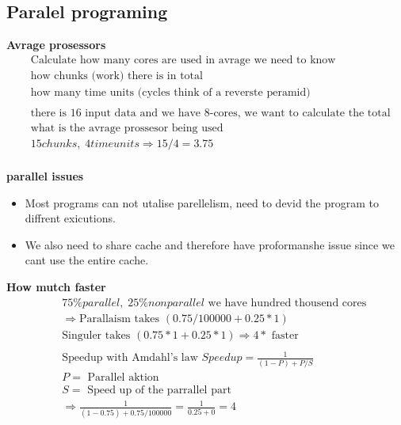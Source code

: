 \subsection{Paralel programing}


\textbf{Avrage prosessors}
\begin{align*}
  &\quad  \text{Calculate how many cores are used in avrage we need to know } \\
  &\quad  \text{how chunks (work) there is in total } \\
  &\quad  \text{how many time units (cycles think of a reverste peramid)} \\
  &\quad  \\
  &\quad  \text{there is 16 input data and we have 8-cores, we want to calculate the total sum} \\
  &\quad  \text{what is the avrage prossesor being used} \\
  &\quad  15 chunks, \; 4 time units \Rightarrow 15/4 = 3.75 \\
\end{align*}

\textbf{parallel issues}
\begin{itemize}
\item  Most programs can not utalise parellelism, need to devid the program to diffrent exicutions.
\item  We also need to share cache and therefore have proformanshe issue since we cant use the entire cache.
\end{itemize}


\textbf{How mutch faster}
\begin{align*}
  &\quad  75\% parallel, \; 25\% non parallel \text{ we have hundred thousend cores } \\
  &\quad  \Rightarrow  \text{Parallaism takes } (0.75/100000 + 0.25*1) \\
  &\quad  \text{Singuler takes } (0.75*1 + 0.25*1)  \Rightarrow 4* \text{ faster} \\
  &\quad  \\
  &\quad  \text{Speedup with Amdahl's law } Speedup=\frac{1}{(1-P)+P/S} \\
  &\quad  P= \text{ Parallel aktion} \\
  &\quad  S= \text{ Speed up of the parrallel part} \\
  &\quad  \Rightarrow \frac{1}{(1-0.75)+0.75/100000} = \frac{1}{0.25+0}= 4 \\
\end{align*}



